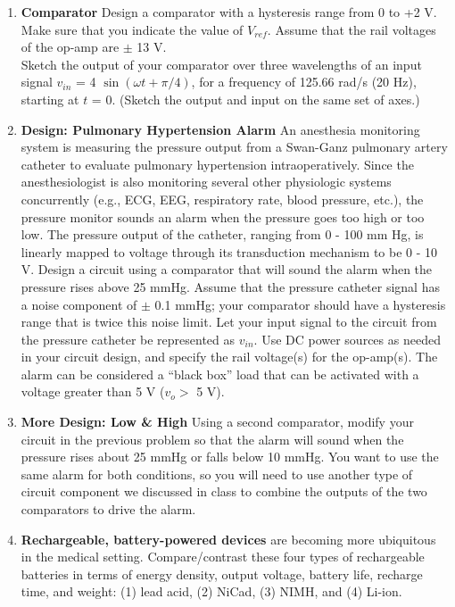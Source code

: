 \begin{enumerate}
\item {\bf Comparator} Design a comparator with a hysteresis range from 0 to +2
    V.  Make sure that you indicate the value of $V_{ref}$.  Assume that the
    rail voltages of the op-amp are $\pm$ 13 V.\\

    Sketch the output of your comparator over three wavelengths of an input
    signal $v_{in}$ = 4 $\sin(\omega t + \pi/4)$, for a frequency of 125.66
    rad/s (20 Hz), starting at $t$ = 0.  (Sketch the output and input on the
    same set of axes.) \\

\item {\bf Design: Pulmonary Hypertension Alarm} An anesthesia monitoring
    system is measuring the pressure output from a Swan-Ganz pulmonary artery
    catheter to evaluate pulmonary hypertension intraoperatively.  Since the
    anesthesiologist is also monitoring several other physiologic systems
    concurrently (e.g., ECG, EEG, respiratory rate, blood pressure, etc.), the
    pressure monitor sounds an alarm when the pressure goes too high or too
    low.  The pressure output of the catheter, ranging from 0 - 100 mm Hg, is
    linearly mapped to voltage through its transduction mechanism to be 0 - 10
    V.  Design a circuit using a comparator that will sound the alarm when the
    pressure rises above 25 mmHg.  Assume that the pressure catheter signal has
    a noise component of $\pm$ 0.1 mmHg; your comparator should have a
    hysteresis range that is twice this noise limit.  Let your input signal to
    the circuit from the pressure catheter be represented as $v_{in}$.  Use DC
    power sources as needed in your circuit design, and specify the rail
    voltage(s) for the op-amp(s).  The alarm can be considered a ``black box''
    load that can be activated with a voltage greater than 5 V ($v_o >$ 5 V).\\

\item {\bf More Design: Low \& High} Using a second comparator, modify your
    circuit in the previous problem so that the alarm will sound when the
    pressure rises about 25 mmHg or falls below 10 mmHg.  You want to use the
    same alarm for both conditions, so you will need to use another type of
    circuit component we discussed in class to combine the outputs of the two
    comparators to drive the alarm. \\

\item {\bf Rechargeable, battery-powered devices} are becoming more ubiquitous
    in the medical setting.  Compare/contrast these four types of rechargeable
    batteries in terms of energy density, output voltage, battery life,
    recharge time, and weight: (1) lead acid, (2) NiCad, (3) NIMH, and (4)
    Li-ion.


\end{enumerate}
